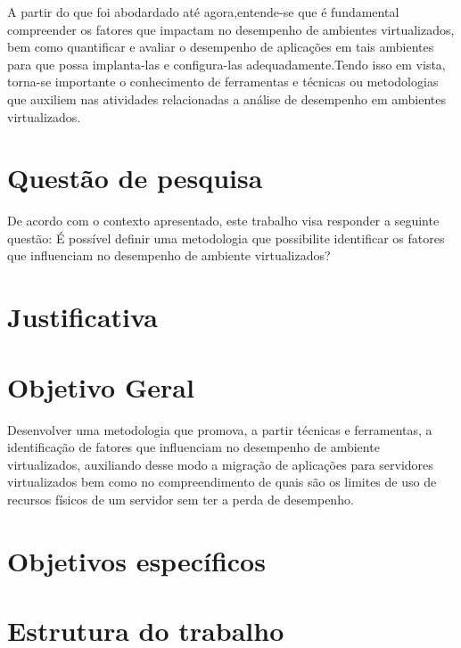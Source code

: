 A partir do que foi abodardado até agora,entende-se que é fundamental compreender os fatores que impactam no desempenho de ambientes virtualizados, bem como quantificar e avaliar o desempenho de aplicações em tais ambientes para que possa implanta-las e configura-las adequadamente.Tendo isso em vista, torna-se importante o conhecimento de ferramentas e técnicas ou metodologias que auxiliem nas atividades relacionadas a análise de desempenho em ambientes virtualizados. 

\section{Quest\~ao de pesquisa}
De acordo com o contexto apresentado, este trabalho visa responder a seguinte questão: É possível definir uma metodologia que possibilite identificar os fatores que influenciam no desempenho de ambiente virtualizados? 

\section{Justificativa}

\section{Objetivo Geral}
Desenvolver uma metodologia que promova, a partir técnicas e ferramentas, a identificação de fatores que influenciam no desempenho de ambiente virtualizados, auxiliando desse modo a migração de aplicações para servidores virtualizados bem como no compreendimento de quais são os limites de uso de recursos físicos de um servidor sem ter a perda de desempenho.   
\section{Objetivos específicos}

\section{Estrutura do trabalho}

